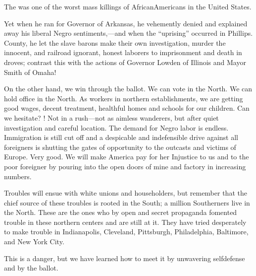 \documentclass[letterpaper,10pt,english]{jupyterBook}
\begin{document}
\begin{sphinxShadowBox}
\sphinxstylesidebartitle{}

\sphinxAtStartPar
The  was one of the worst mass killings of African\sphinxhyphen{}Americans in the United States.
\end{sphinxShadowBox}

\sphinxAtStartPar
Yet when he ran for Governor of Arkansas, he vehemently denied and explained away his liberal Negro sentiments,—and when the “uprising” occurred in Phillips. County, he let the slave barons make their own investigation, murder the innocent, and railroad ignorant, honest laborers to imprisonment and death in droves; contrast this with the actions of Governor Lowden of Illinois and Mayor Smith of Omaha!

\sphinxAtStartPar
On the other hand, we win through the ballot. We can vote in the North. We can hold office in the North. As workers in northern establishments, we are getting good wages, decent treatment, healthful homes and schools for our children. Can we hesitate? ! Not in a rush—not as aimless wanderers, but after quiet investigation and careful location. The demand for Negro labor is endless. Immigration is still cut off and a despicable and indefensible drive against all foreigners is shutting the gates of opportunity to the outcasts and victims of Europe. Very good. We will make America pay for her Injustice to us and to the poor foreigner by pouring into the open doors of mine and factory in increasing numbers.

\sphinxAtStartPar
Troubles will ensue with white unions and householders, but remember that the chief source of these troubles is rooted in the South; a million Southerners live in the North. These are the ones who by open and secret propaganda fomented trouble in these northern centers and are still at it. They have tried desperately to make trouble in Indianapolis, Cleveland, Pittsburgh, Philadelphia, Baltimore, and New York City.

\sphinxAtStartPar
This is a danger, but we have learned how to meet it by unwavering self\sphinxhyphen{}defense and by the ballot.
\end{document}
